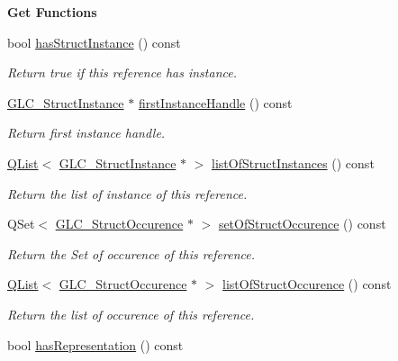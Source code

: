 \begin{Indent}{\bf Get Functions}\par
\begin{DoxyCompactItemize}
\item 
bool \hyperlink{class_g_l_c___struct_reference_a5ec763def91b914e32a254014f0824a1}{has\-Struct\-Instance} () const 
\begin{DoxyCompactList}\small\item\em Return true if this reference has instance. \end{DoxyCompactList}\item 
\hyperlink{class_g_l_c___struct_instance}{G\-L\-C\-\_\-\-Struct\-Instance} $\ast$ \hyperlink{class_g_l_c___struct_reference_a4dbcf82fde25abeb04f4bfe4814b7ba0}{first\-Instance\-Handle} () const 
\begin{DoxyCompactList}\small\item\em Return first instance handle. \end{DoxyCompactList}\item 
\hyperlink{class_q_list}{Q\-List}$<$ \hyperlink{class_g_l_c___struct_instance}{G\-L\-C\-\_\-\-Struct\-Instance} $\ast$ $>$ \hyperlink{class_g_l_c___struct_reference_af3c3ef777565b2c2a2e0e673ff457862}{list\-Of\-Struct\-Instances} () const 
\begin{DoxyCompactList}\small\item\em Return the list of instance of this reference. \end{DoxyCompactList}\item 
Q\-Set$<$ \hyperlink{class_g_l_c___struct_occurence}{G\-L\-C\-\_\-\-Struct\-Occurence} $\ast$ $>$ \hyperlink{class_g_l_c___struct_reference_a8ac61f585e609eb8ef7e00f3801a7e54}{set\-Of\-Struct\-Occurence} () const 
\begin{DoxyCompactList}\small\item\em Return the Set of occurence of this reference. \end{DoxyCompactList}\item 
\hyperlink{class_q_list}{Q\-List}$<$ \hyperlink{class_g_l_c___struct_occurence}{G\-L\-C\-\_\-\-Struct\-Occurence} $\ast$ $>$ \hyperlink{class_g_l_c___struct_reference_a50235a9691bfde0d6250906c4b27d3fd}{list\-Of\-Struct\-Occurence} () const 
\begin{DoxyCompactList}\small\item\em Return the list of occurence of this reference. \end{DoxyCompactList}\item 
bool \hyperlink{class_g_l_c___struct_reference_a8a27979b97492950c7d63cffcea99d59}{has\-Representation} () const 

\end{DoxyCompactItemize}
\end{Indent}
